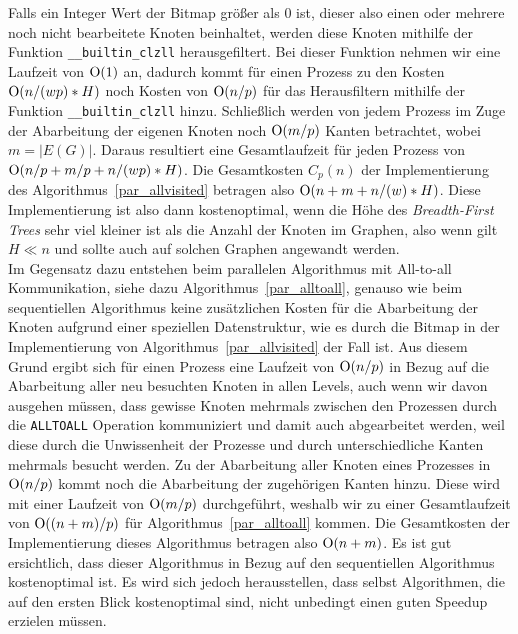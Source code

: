 \documentclass[11pt,a4paper]{article}
\begin{document}
Falls ein Integer Wert der Bitmap größer als 0 ist, dieser also einen oder mehrere noch nicht bearbeitete Knoten beinhaltet, werden diese Knoten mithilfe der Funktion \lstinline{__builtin_clzll} herausgefiltert. Bei dieser Funktion nehmen wir eine Laufzeit von \($O$(1)\) an, dadurch kommt für einen Prozess zu den Kosten \($O$(n/(wp)*H)\) noch Kosten von \($O$(n/p)\) für das Herausfiltern mithilfe der Funktion \lstinline{__builtin_clzll} hinzu. Schließlich werden von jedem Prozess im Zuge der Abarbeitung der eigenen Knoten noch \($O$(m/p)\) Kanten betrachtet, wobei \(m = |E(G)|\). Daraus resultiert eine Gesamtlaufzeit für jeden Prozess von \($O$(n/p + m/p + n/(wp)*H)\).  Die Gesamtkosten \(C_{p}(n)\) der Implementierung des Algorithmus~\ref{par_allvisited} betragen also \($O$(n + m + n/(w)*H)\). Diese Implementierung ist also dann kostenoptimal, wenn die Höhe des \textit{Breadth-First Trees} sehr viel kleiner ist als die Anzahl der Knoten im Graphen, also wenn gilt \(H \ll n\) und sollte auch auf solchen Graphen angewandt werden.\\
Im Gegensatz dazu entstehen beim parallelen Algorithmus mit All-to-all Kommunikation, siehe dazu Algorithmus~\ref{par_alltoall}, genauso wie beim sequentiellen Algorithmus keine zusätzlichen Kosten für die Abarbeitung der Knoten aufgrund einer speziellen Datenstruktur, wie es durch die Bitmap in der Implementierung von Algorithmus~\ref{par_allvisited} der Fall ist. Aus diesem Grund ergibt sich für einen Prozess eine Laufzeit von \($O$(n/p)\) in Bezug auf die Abarbeitung aller neu besuchten Knoten in allen Levels, auch wenn wir davon ausgehen müssen, dass gewisse Knoten mehrmals zwischen den Prozessen durch die \lstinline{ALLTOALL} Operation kommuniziert und damit auch abgearbeitet werden, weil diese durch die Unwissenheit der Prozesse und durch unterschiedliche Kanten mehrmals besucht werden. Zu der Abarbeitung aller Knoten eines Prozesses in \($O$(n/p)\) kommt noch die Abarbeitung der zugehörigen Kanten hinzu. Diese wird mit einer Laufzeit von \($O$(m/p)\) durchgeführt, weshalb wir zu einer Gesamtlaufzeit von \($O$((n + m)/p)\) für Algorithmus~\ref{par_alltoall} kommen. Die Gesamtkosten der Implementierung dieses Algorithmus betragen also \($O$(n + m)\). Es ist gut ersichtlich, dass dieser Algorithmus in Bezug auf den sequentiellen Algorithmus kostenoptimal ist. Es wird sich jedoch herausstellen, dass selbst Algorithmen, die auf den ersten Blick kostenoptimal sind, nicht unbedingt einen guten Speedup erzielen müssen.
\end{document}
